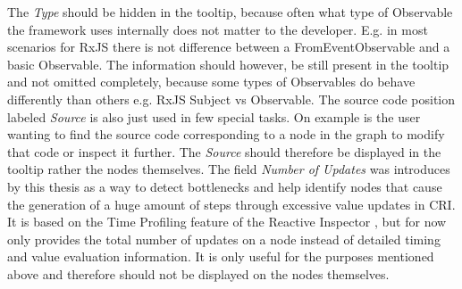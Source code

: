 The \emph{Type} should be hidden in the tooltip, because often what type of Observable the framework uses internally does not matter to the developer. E.g. in most scenarios for RxJS there is not difference between a FromEventObservable and a basic Observable. The information should however, be still present in the tooltip and not omitted completely, because some types of Observables do behave differently than others e.g. RxJS Subject vs Observable. The source code position labeled \emph{Source} is also just used in few special tasks. On example is the user wanting to find the source code corresponding to a node in the graph to modify that code or inspect it further. The \emph{Source} should therefore be displayed in the tooltip rather the nodes themselves. The field \emph{Number of Updates} was introduces by this thesis as a way to detect bottlenecks and help identify nodes that cause the generation of a huge amount of steps through excessive value updates in CRI. It is based on the Time Profiling feature of the Reactive Inspector \cite{ReactiveInspector}, but for now only provides the total number of updates on a node instead of detailed timing and value evaluation information. It is only useful for the purposes mentioned above and therefore should not be displayed on the nodes themselves.

